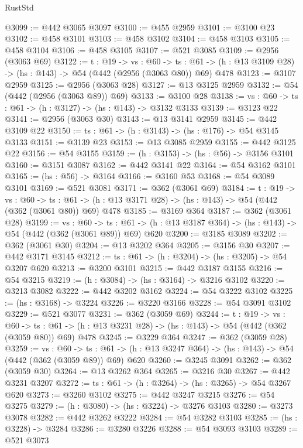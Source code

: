 \begin{lexlean}{RustStd}
\begin{coremodule}
@3099 := @442 @3065 @3097
@3100 := @455 @2959
@3101 := @3100 @23
@3102 := @458 @3101
@3103 := @458 @3102
@3104 := @458 @3103
@3105 := @458 @3104
@3106 := @458 @3105
@3107 := @521 @3085
@3109 := @2956 (@3063 @69)
@3122 := {t : @19} ->
  {vs : @60} ->
  {ts : @61} -> (h : @13 @3109 @28) -> (hs : @143) -> @54 (@442 (@2956 (@3063 @80)) @69) @478
@3123 := @3107 @2959
@3125 := @2956 (@3063 @28)
@3127 := @13 @3125 @2959
@3132 := @54 (@442 (@2956 (@3063 @89)) @69)
@3133 := @3100 @28
@3138 := {vs : @60} -> {ts : @61} -> (h : @3127) -> (hs : @143) -> @3132 @3133
@3139 := @3123 @22
@3141 := @2956 (@3063 @30)
@3143 := @13 @3141 @2959
@3145 := @442 @3109 @22
@3150 := {ts : @61} -> (h : @3143) -> (hs : @176) -> @54 @3145 @3133
@3151 := @3139 @23
@3153 := @13 @3085 @2959
@3155 := @442 @3125 @22
@3156 := @54 @3155
@3159 := (h : @3153) -> (hs : @56) -> @3156 @3101
@3160 := @3151 @3087
@3162 := @442 @3141 @22
@3164 := @54 @3162 @3101
@3165 := (hs : @56) -> @3164
@3166 := @3160 @53
@3168 := @54 @3089 @3101
@3169 := @521 @3081
@3171 := @362 (@3061 @69)
@3184 := {t : @19} ->
  {vs : @60} ->
  {ts : @61} -> (h : @13 @3171 @28) -> (hs : @143) -> @54 (@442 (@362 (@3061 @80)) @69) @478
@3185 := @3169 @364
@3187 := @362 (@3061 @28)
@3199 := {vs : @60} ->
  {ts : @61} -> (h : @13 @3187 @364) -> (hs : @143) -> @54 (@442 (@362 (@3061 @89)) @69) @620
@3200 := @3185 @3089
@3202 := @362 (@3061 @30)
@3204 := @13 @3202 @364
@3205 := @3156 @30
@3207 := @442 @3171 @3145
@3212 := {ts : @61} -> (h : @3204) -> (hs : @3205) -> @54 @3207 @620
@3213 := @3200 @3101
@3215 := @442 @3187 @3155
@3216 := @54 @3215
@3219 := (h : @3084) -> (hs : @3164) -> @3216 @3102
@3220 := @3213 @3082
@3222 := @442 @3202 @3162
@3224 := @54 @3222 @3102
@3225 := (hs : @3168) -> @3224
@3226 := @3220 @3166
@3228 := @54 @3091 @3102
@3229 := @521 @3077
@3231 := @362 (@3059 @69)
@3244 := {t : @19} ->
  {vs : @60} ->
  {ts : @61} -> (h : @13 @3231 @28) -> (hs : @143) -> @54 (@442 (@362 (@3059 @80)) @69) @478
@3245 := @3229 @364
@3247 := @362 (@3059 @28)
@3259 := {vs : @60} ->
  {ts : @61} -> (h : @13 @3247 @364) -> (hs : @143) -> @54 (@442 (@362 (@3059 @89)) @69) @620
@3260 := @3245 @3091
@3262 := @362 (@3059 @30)
@3264 := @13 @3262 @364
@3265 := @3216 @30
@3267 := @442 @3231 @3207
@3272 := {ts : @61} -> (h : @3264) -> (hs : @3265) -> @54 @3267 @620
@3273 := @3260 @3102
@3275 := @442 @3247 @3215
@3276 := @54 @3275
@3279 := (h : @3080) -> (hs : @3224) -> @3276 @3103
@3280 := @3273 @3078
@3282 := @442 @3262 @3222
@3284 := @54 @3282 @3103
@3285 := (hs : @3228) -> @3284
@3286 := @3280 @3226
@3288 := @54 @3093 @3103
@3289 := @521 @3073

\end{coremodule}
\end{lexlean}
